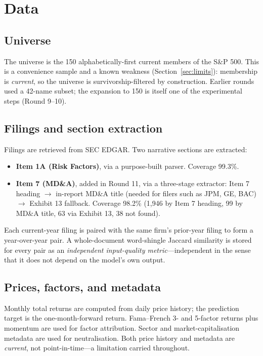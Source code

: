 \documentclass[11pt]{article}
\begin{document}
\section{Data}
\label{sec:data}

\subsection{Universe}

The universe is the 150 alphabetically-first current members of the S\&P 500. This is a
convenience sample and a known weakness (Section~\ref{sec:limits}): membership is
\emph{current}, so the universe is survivorship-filtered by construction. Earlier rounds
used a 42-name subset; the expansion to 150 is itself one of the experimental steps
(Round 9--10).

\subsection{Filings and section extraction}

Filings are retrieved from SEC EDGAR. Two narrative sections are extracted:

\begin{itemize}[leftmargin=1.4em,itemsep=0.2em]
  \item \textbf{Item 1A (Risk Factors)}, via a purpose-built parser. Coverage 99.3\%.
  \item \textbf{Item 7 (MD\&A)}, added in Round 11, via a three-stage extractor:
        Item 7 heading $\rightarrow$ in-report MD\&A title (needed for filers such as
        JPM, GE, BAC) $\rightarrow$ Exhibit 13 fallback. Coverage 98.2\%
        (1,946 by Item 7 heading, 99 by MD\&A title, 63 via Exhibit 13, 38 not found).
\end{itemize}

Each current-year filing is paired with the same firm's prior-year filing to form a
year-over-year pair. A whole-document word-shingle Jaccard similarity is stored for every
pair as an \emph{independent input-quality metric}---independent in the sense that it does
not depend on the model's own output.

\subsection{Prices, factors, and metadata}

Monthly total returns are computed from daily price history; the prediction target is the
one-month-forward return. Fama--French 3- and 5-factor returns plus momentum are used for
factor attribution. Sector and market-capitalisation metadata are used for neutralisation.
Both price history and metadata are \emph{current}, not point-in-time---a limitation
carried throughout.
\end{document}
